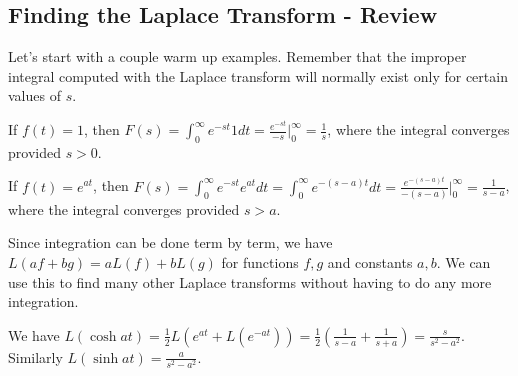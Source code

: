 \subsection{Finding the Laplace Transform - Review}
Let's start with a couple warm up examples. Remember that the improper integral computed with the Laplace transform will normally exist only for certain values of $s$. 
\begin{example}
If $f(t)=1$, then $F(s)=\int_0^\infty e^{-st}1dt= \frac{e^{-st}}{-s}\big|_0^\infty = \frac{1}{s}$, where the integral converges provided $s>0$. 
\end{example}
\begin{example}
If $f(t)=e^{at}$, then $F(s)=\int_0^\infty e^{-st}e^{at}dt=\int_0^\infty e^{-(s-a)t}dt= \frac{e^{-(s-a)t}}{-(s-a)}\big|_0^\infty = \frac{1}{s-a}$, where the integral converges provided $s>a$. 
\end{example}

Since integration can be done term by term, we have $L(af+bg)=aL(f)+bL(g)$ for functions $f,g$ and constants $a,b$.  We can use this to find many other Laplace transforms without having to do any more integration. 
\begin{example}
We have $L(\cosh a t) = \frac{1}{2}L(e^{at}+L(e^{-a t}))=\frac{1}{2}\left(\frac{1}{s-a}+\frac{1}{s+a}\right) = \frac{s}{s^2-a^2}$. Similarly $L(\sinh a t) = \frac{a}{s^2-a^2}$.  
\end{example}


